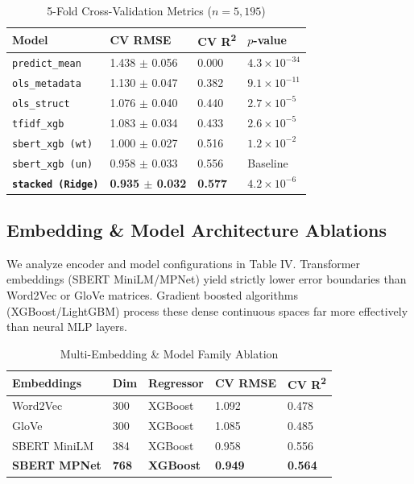 \documentclass[conference]{IEEEtran}
\begin{document}
\begin{table}[htbp]
\caption{5-Fold Cross-Validation Metrics ($n = 5,195$)}
\begin{center}
\begin{tabular}{|l|l|l|l|}
\hline
\textbf{Model} & \textbf{CV RMSE} & \textbf{CV R\textsuperscript{2}} & \textbf{$p$-value} \\
\hline
\texttt{predict\_mean} & 1.438 $\pm$ 0.056 & 0.000 & $4.3 \times 10^{-34}$ \\
\hline
\texttt{ols\_metadata} & 1.130 $\pm$ 0.047 & 0.382 & $9.1 \times 10^{-11}$ \\
\hline
\texttt{ols\_struct} & 1.076 $\pm$ 0.040 & 0.440 & $2.7 \times 10^{-5}$ \\
\hline
\texttt{tfidf\_xgb} & 1.083 $\pm$ 0.034 & 0.433 & $2.6 \times 10^{-5}$ \\
\hline
\texttt{sbert\_xgb (wt)} & 1.000 $\pm$ 0.027 & 0.516 & $1.2 \times 10^{-2}$ \\
\hline
\texttt{sbert\_xgb (un)} & 0.958 $\pm$ 0.033 & 0.556 & Baseline \\
\hline
\textbf{\texttt{stacked (Ridge)}} & \textbf{0.935 $\pm$ 0.032} & \textbf{0.577} & \textbf{$4.2 \times 10^{-6}$} \\
\hline
\end{tabular}
\label{tab3}
\end{center}
\end{table}

\subsection{Embedding \& Model Architecture Ablations}
We analyze encoder and model configurations in Table IV. Transformer embeddings (SBERT MiniLM/MPNet) yield strictly lower error boundaries than Word2Vec or GloVe matrices. Gradient boosted algorithms (XGBoost/LightGBM) process these dense continuous spaces far more effectively than neural MLP layers. 

\begin{table}[htbp]
\caption{Multi-Embedding \& Model Family Ablation}
\begin{center}
\begin{tabular}{|l|l|l|l|l|}
\hline
\textbf{Embeddings} & \textbf{Dim} & \textbf{Regressor} & \textbf{CV RMSE} & \textbf{CV R\textsuperscript{2}} \\
\hline
Word2Vec & 300 & XGBoost & 1.092 & 0.478 \\
\hline
GloVe & 300 & XGBoost & 1.085 & 0.485 \\
\hline
SBERT MiniLM & 384 & XGBoost & 0.958 & 0.556 \\
\hline
\textbf{SBERT MPNet} & \textbf{768} & \textbf{XGBoost} & \textbf{0.949} & \textbf{0.564} \\
\hline
\end{tabular}
\label{tab4}
\end{center}
\end{table}
\end{document}
